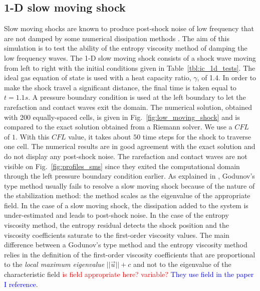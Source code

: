 \documentclass[preprint,10pt]{elsarticle}
\newcommand{\fig}[1]{Fig.~\ref{#1}}                      %
\newcommand{\tbl}[1]{Table~\ref{#1}}                     %
\newcommand{\tcr}[1]{\textcolor{red}{#1}}
\newcommand{\tcb}[1]{\textcolor{blue}{#1}}
\begin{document}
\subsection{1-D slow moving shock} \label{sec:slow_moving_shock}

Slow moving shocks are known to produce post-shock noise of low frequency that are not damped by some numerical dissipation methods \cite{james}. The aim of this simulation is to test the ability of the entropy viscosity method of damping the low frequency waves.
The 1-D slow moving shock consists of a shock wave moving from left to right with the initial conditions given in \tbl{tbl:ic_1d_tests}. The ideal gas equation of state is used with a heat capacity ratio, $\gamma$, of 1.4.  In order to make the shock travel a significant distance, the final time is taken equal to $t=1.1s$. A pressure boundary condition is used at the left boundary to let the rarefaction and contact waves exit the domain.   
%
The numerical solution, obtained with 200 equally-spaced cells, is given in \fig{fig:low_moving_shock} and is compared to the exact solution obtained from a Riemann solver. We use a $CFL$ of $1$. With this $CFL$ value, it takes about $50$ time steps for the shock to traverse one cell.
%
The numerical results are in good agreement with the exact solution and do not display any post-shock noise. The rarefaction and contact waves are not visible on \fig{fig:profiles_sms} since they exited the computational domain through the left pressure boundary condition earlier. As explained in \cite{roberts}, Godunov's type method usually fails to resolve a slow moving shock because of the nature of the stabilization method: the method scales as the eigenvalue of the appropriate field. In the case of a slow moving shock, the dissipation added to the system is under-estimated and leads to post-shock noise. In the case of the entropy viscosity method, the entropy residual detects the shock position and the viscosity coefficients saturate to the first-order viscosity values. The main difference between a  Godunov's type method and the entropy viscosity method relies in the definition of the first-order viscosity coefficients that are proportional to the \emph{local maximum eigenvalue} $||\vec{u}||+c$ and not to the eigenvalue of the characteristic field \tcr{is field appropriate here? variable?} \tcb{They use field in the paper I reference}.
\end{document}

